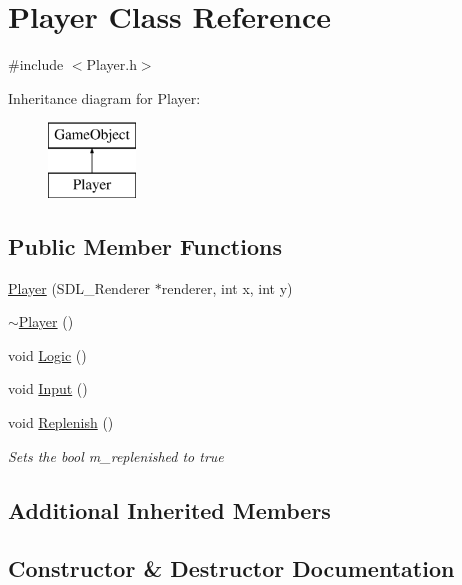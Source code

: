 \hypertarget{class_player}{}\section{Player Class Reference}
\label{class_player}


{\ttfamily \#include $<$Player.\+h$>$}

Inheritance diagram for Player\+:\begin{figure}[H]
\begin{center}
\leavevmode
\includegraphics[height=2.000000cm]{class_player}
\end{center}
\end{figure}
\subsection*{Public Member Functions}
\begin{DoxyCompactItemize}
\item 
\mbox{\hyperlink{class_player_a753df4f66aa114c0789ba730199e4a01}{Player}} (S\+D\+L\+\_\+\+Renderer $\ast$renderer, int x, int y)
\item 
\mbox{\hyperlink{class_player_a749d2c00e1fe0f5c2746f7505a58c062}{$\sim$\+Player}} ()
\item 
void \mbox{\hyperlink{class_player_ae30c8d49de94ee8c73ed6ab6315a2854}{Logic}} ()
\item 
void \mbox{\hyperlink{class_player_a65a76094cff6f149d5847d2110fe443d}{Input}} ()
\item 
void \mbox{\hyperlink{class_player_a7da8c52d956abfc5a31742545c5d50b8}{Replenish}} ()
\begin{DoxyCompactList}\small\item\em Sets the bool m\+\_\+replenished to true \end{DoxyCompactList}\end{DoxyCompactItemize}
\subsection*{Additional Inherited Members}


\subsection{Constructor \& Destructor Documentation}
\mbox{\label{class_player_a753df4f66aa114c0789ba730199e4a01}} 
